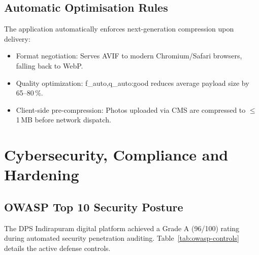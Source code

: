 \documentclass[11pt,a4paper,oneside]{report}
\def\textbf#1{#1}
\def\texttt#1{#1}
\def\&{and}
\begin{document}
\section{Automatic Optimisation Rules}

The application automatically enforces next-generation compression upon delivery:
\begin{itemize}
  \item Format negotiation: Serves \textbf{AVIF} to modern Chromium/Safari browsers, falling back to \textbf{WebP}.
  \item Quality optimization: \texttt{f\_auto,q\_auto:good} reduces average payload size by 65--80\,\%.
  \item Client-side pre-compression: Photos uploaded via CMS are compressed to $\leq$1\,MB before network dispatch.
\end{itemize}

\chapter{Cybersecurity, Compliance \texorpdfstring{\&}{and} Hardening}

\section{OWASP Top 10 Security Posture}

The DPS Indirapuram digital platform achieved a \textbf{Grade A (96/100)} rating
during automated security penetration auditing. Table~\ref{tab:owasp-controls} details
the active defense controls.
\end{document}
